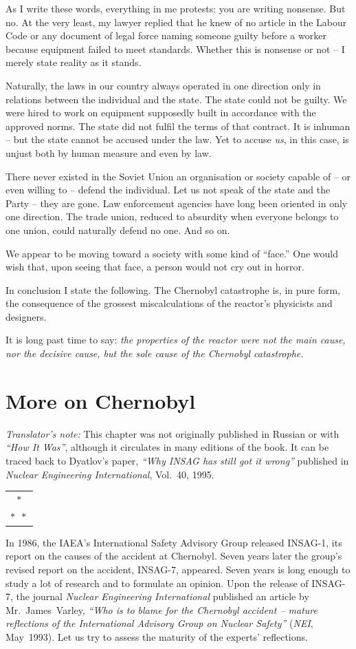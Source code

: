 \documentclass[openright]{bookest}
\newcommand{\varthreestars}{\begin{center}\begin{tabular}{c}$\ast$\\[-0.8ex] $\ast\enspace \ast $\end{tabular}\end{center}}
\begin{document}
As I write these words, everything in me protests: you are writing nonsense. But no. At the very least, my lawyer replied that he knew of no article in the Labour Code or any document of legal force naming someone guilty before a worker because equipment failed to meet standards. Whether this is nonsense or not -- I merely state reality as it stands.

Naturally, the laws in our country always operated in one direction only in relations between the individual and the state. The state could not be guilty. We were hired to work on equipment supposedly built in accordance with the approved norms. The state did not fulfil the terms of that contract. It is inhuman -- but the state cannot be accused under the law. Yet to accuse \textit{us}, in this case, is unjust both by human measure and even by law.

There never existed in the Soviet Union an organisation or society capable of -- or even willing to -- defend the individual. Let us not speak of the state and the Party -- they are gone. Law enforcement agencies have long been oriented in only one direction. The trade union, reduced to absurdity when everyone belongs to one union, could naturally defend no one. And so on.

We appear to be moving toward a society with some kind of ``face.'' One would wish that, upon seeing that face, a person would not cry out in horror.

In conclusion I state the following. The Chernobyl catastrophe is, in pure form, the consequence of the grossest miscalculations of the reactor's physicists and designers.

It is long past time to say: \textit{the properties of the reactor were not the main cause, nor the decisive cause, but the sole cause of the Chernobyl catastrophe.}

\chapter{More on Chernobyl}

\textit{Translator's note:} This chapter was not originally published in Russian or with \textit{``How It Was''}, although it circulates in many editions of the book. It can be traced back to Dyatlov's paper, \textit{``Why INSAG has still got it wrong''} published in \textit{Nuclear Engineering International}, Vol.~40, 1995.

\varthreestars

In 1986, the IAEA's International Safety Advisory Group released INSAG-1, its report on the causes of the accident at Chernobyl. Seven years later the group's revised report on the accident, INSAG-7, appeared. Seven years is long enough to study a lot of research and to formulate an opinion. Upon the release of INSAG-7, the journal \textit{Nuclear Engineering International} published an article by Mr.~James~Varley, \textit{``Who is to blame for the Chernobyl accident -- mature reflections of the International Advisory Group on Nuclear Safety''} (\textit{NEI}, May~1993). Let us try to assess the maturity of the experts' reflections.
\end{document}
